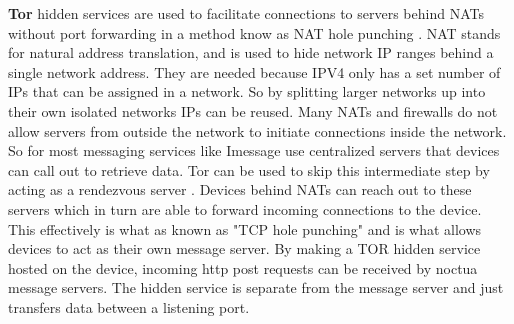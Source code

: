 \documentclass[../main/main.tex]{subfiles}
\begin{document}
\textbf{Tor} hidden services are used to facilitate connections to servers behind NATs without port forwarding in a method know as NAT hole punching \cite{TCP}. 
NAT stands for natural address translation, and is used to hide network IP ranges behind a single network address. 
They are needed because IPV4 only has a set number of IPs that can be assigned in a network. 
So by splitting larger networks up into their own isolated networks IPs can be reused. 
Many NATs and firewalls do not allow servers from outside the network to initiate connections inside the network. 
So for most messaging services like Imessage use centralized servers that devices can call out to retrieve data. 
Tor can be used to skip this intermediate step by acting as a rendezvous server \cite{TOR}. 
Devices behind NATs can reach out to these servers which in turn are able to forward incoming connections to the device.
This effectively is what as known as "TCP hole punching" and is what allows devices to act as their own message server. 
By making a TOR hidden service hosted on the device, incoming http post requests can be received by noctua message servers. 
The hidden service is separate from the message server and just transfers data between a listening port.
\end{document}
